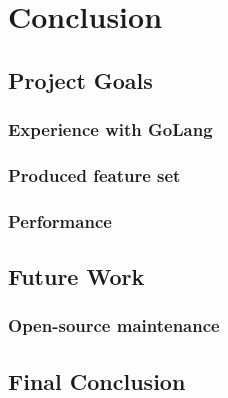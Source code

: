 \chapter{Conclusion}
\label{chap:Conclusion}

\section{Project Goals}
\label{sec:Project Goals}


\subsection{Experience with GoLang}
\label{sub:Experience with GoLang}


\subsection{Produced feature set}
\label{sub:Produced featureset}


\subsection{Performance}
\label{sub:Performance}


\section{Future Work}
\label{sec:Future Work}


\subsection{Open-source maintenance}
\label{sub:Open-source maintanance}


\section{Final Conclusion}
\label{sec:Final Conclusion}
